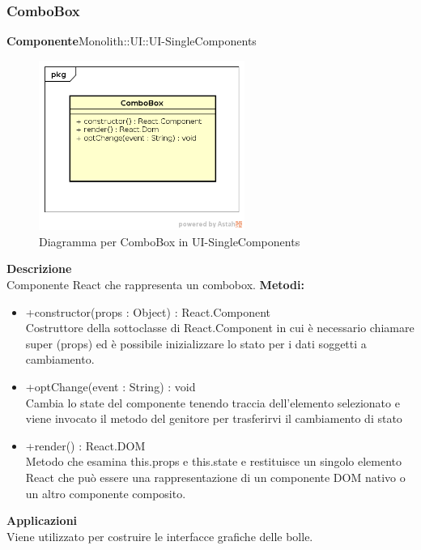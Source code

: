 \subsubsection{ComboBox}
\textbf{Componente}Monolith::UI::UI-SingleComponents\\
   \FloatBarrier
   \begin{figure}[ht]
   \centering
   \includegraphics[width=0.6\textwidth]{img/single-ComboBox}
   \caption{{Diagramma per ComboBox in UI-SingleComponents}}
\end{figure}
\FloatBarrier
\textbf{Descrizione}\\
Componente React che rappresenta un combobox.
\textbf{Metodi:} \begin{itemize}\item +constructor(props : Object) : React.Component \\Costruttore della sottoclasse di React.Component in cui è necessario chiamare super (props) ed è possibile inizializzare lo stato per i dati soggetti a cambiamento.\item +optChange(event : String) : void  \\Cambia lo state del componente tenendo traccia dell'elemento selezionato e viene invocato il metodo del genitore per trasferirvi il cambiamento di stato\item +render() : React.DOM \\Metodo che esamina this.props e this.state e restituisce un singolo elemento React che può essere una rappresentazione di un componente DOM nativo o un altro componente composito.\end{itemize} 


\textbf{Applicazioni}\\
Viene utilizzato per costruire le interfacce grafiche delle bolle. 


\clearpage

